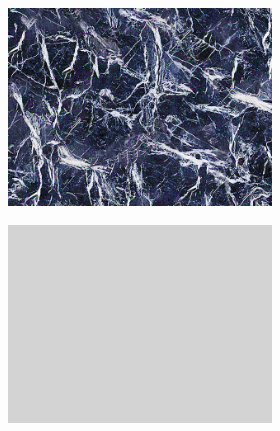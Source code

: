 \begin{figure}[]
\begin{subfigure}{\textwidth}
        \begin{subfigure}{0.19\textwidth}
            \centering
            \includegraphics[width=\textwidth]{images/04-experiment02/isolating_issues/target.jpg}
            \caption*{}
        \end{subfigure}
        \hfill
        \begin{subfigure}{0.19\textwidth}
            \centering
            \includegraphics[width=\textwidth]{images/04-experiment02/isolating_issues/210_bg.jpg}
            \caption*{}
        \end{subfigure}
        \hfill
        \begin{subfigure}{0.19\textwidth}

\end{subfigure}
\end{subfigure}
\end{figure}
